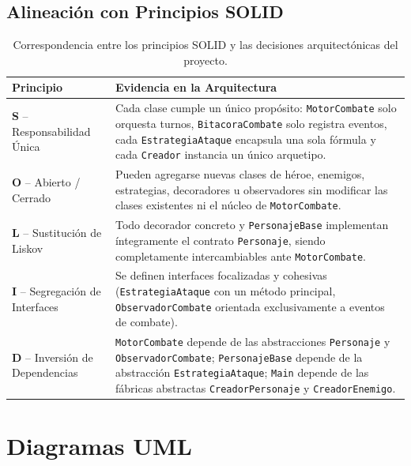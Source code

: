 \documentclass[12pt,letterpaper]{article}
\begin{document}
\subsection{Alineación con Principios SOLID}

\begin{table}[H]
    \centering
    \caption{Correspondencia entre los principios SOLID y las decisiones arquitectónicas del proyecto.}
    \begin{tabular}{l p{10.5cm}}
        \toprule
        \textbf{Principio} & \textbf{Evidencia en la Arquitectura} \\
        \midrule
        \textbf{S} -- Responsabilidad Única & Cada clase cumple un único propósito: \texttt{MotorCombate} solo orquesta turnos, \texttt{BitacoraCombate} solo registra eventos, cada \texttt{EstrategiaAtaque} encapsula una sola fórmula y cada \texttt{Creador} instancia un único arquetipo. \\
        \textbf{O} -- Abierto / Cerrado & Pueden agregarse nuevas clases de héroe, enemigos, estrategias, decoradores u observadores sin modificar las clases existentes ni el núcleo de \texttt{MotorCombate}. \\
        \textbf{L} -- Sustitución de Liskov & Todo decorador concreto y \texttt{PersonajeBase} implementan íntegramente el contrato \texttt{Personaje}, siendo completamente intercambiables ante \texttt{MotorCombate}. \\
        \textbf{I} -- Segregación de Interfaces & Se definen interfaces focalizadas y cohesivas (\texttt{EstrategiaAtaque} con un método principal, \texttt{ObservadorCombate} orientada exclusivamente a eventos de combate). \\
        \textbf{D} -- Inversión de Dependencias & \texttt{MotorCombate} depende de las abstracciones \texttt{Personaje} y \texttt{ObservadorCombate}; \texttt{PersonajeBase} depende de la abstracción \texttt{EstrategiaAtaque}; \texttt{Main} depende de las fábricas abstractas \texttt{CreadorPersonaje} y \texttt{CreadorEnemigo}. \\
        \bottomrule
    \end{tabular}
\end{table}

\section{Diagramas UML}
\end{document}

